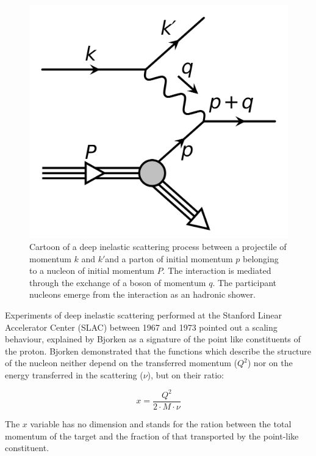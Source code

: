 \begin{figure}[!ht]
\begin{center}
\includegraphics[width=0.5\linewidth]{Chapters/Introduction/Figs/DIS.png}
\caption{Cartoon of a deep inelastic scattering process between a projectile of momentum $k$ and $k'$and a parton of initial momentum $p$ belonging to a nucleon of initial momentum $P$. The interaction is mediated through the exchange of a boson of momentum $q$. The participant nucleons emerge from the interaction as an hadronic shower.}
\label{fig:DIS}
\end{center}
\end{figure}

Experiments of deep inelastic scattering performed at the Stanford Linear Accelerator Center (SLAC) between 1967 and 1973 pointed out a scaling behaviour, explained by Bjorken as a signature of the point like constituents of the proton.
Bjorken demonstrated that the functions which describe the structure of the nucleon neither depend on the transferred momentum ($Q^2$) nor on the energy transferred in the scattering ($\nu$), but on their ratio:

\begin{equation}
    x = \frac{Q^2}{2\cdot M \cdot \nu}
\end{equation}

The $x$ variable has no dimension and stands for the ration between the total momentum of the target and the fraction of that transported by the point-like constituent.


